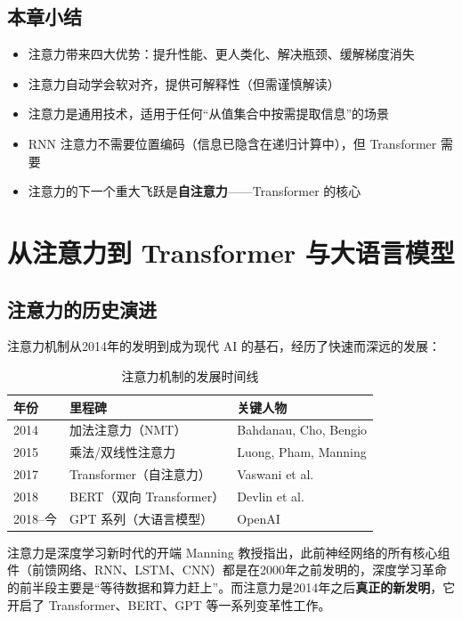 \documentclass[a4paper]{article}
\begin{document}
\subsection{本章小结}

\begin{itemize}
    \item 注意力带来四大优势：提升性能、更人类化、解决瓶颈、缓解梯度消失
    \item 注意力自动学会软对齐，提供可解释性（但需谨慎解读）
    \item 注意力是通用技术，适用于任何``从值集合中按需提取信息''的场景
    \item RNN 注意力不需要位置编码（信息已隐含在递归计算中），但 Transformer 需要
    \item 注意力的下一个重大飞跃是\textbf{自注意力}——Transformer 的核心
\end{itemize}


\section{从注意力到 Transformer 与大语言模型}

\subsection{注意力的历史演进}

注意力机制从2014年的发明到成为现代 AI 的基石，经历了快速而深远的发展：

\begin{table}[H]
\centering
\begin{tabular}{lll}
\toprule
\textbf{年份} & \textbf{里程碑} & \textbf{关键人物} \\
\midrule
2014 & 加法注意力（NMT） & Bahdanau, Cho, Bengio \\
2015 & 乘法/双线性注意力 & Luong, Pham, Manning \\
2017 & Transformer（自注意力） & Vaswani et al. \\
2018 & BERT（双向 Transformer） & Devlin et al. \\
2018--今 & GPT 系列（大语言模型） & OpenAI \\
\bottomrule
\end{tabular}
\caption{注意力机制的发展时间线}
\end{table}

\begin{importantbox}{注意力是深度学习新时代的开端}
Manning 教授指出，此前神经网络的所有核心组件（前馈网络、RNN、LSTM、CNN）都是在2000年之前发明的，深度学习革命的前半段主要是``等待数据和算力赶上''。而注意力是2014年之后\textbf{真正的新发明}，它开启了 Transformer、BERT、GPT 等一系列变革性工作。
\end{importantbox}
\end{document}
